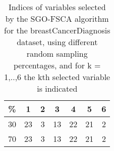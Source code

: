 \begin{table}
	\begin{center}
		\begin{tabular}{c c c c c c c}
			\% & 1 & 2 & 3 & 4 & 5 & 6 \\
			\hline
			30 & 23 & 3 & 13 & 22 & 21 & 2 \\
			70 & 23 & 3 & 13 & 22 & 21 & 2 \\
		\end{tabular}
	\end{center}
	\caption{Indices of variables selected by the SGO-FSCA algorithm for the breastCancerDiagnosis dataset, using different random sampling percentages, and for k = 1,..,6 the kth selected variable is indicated}
\end{table}
